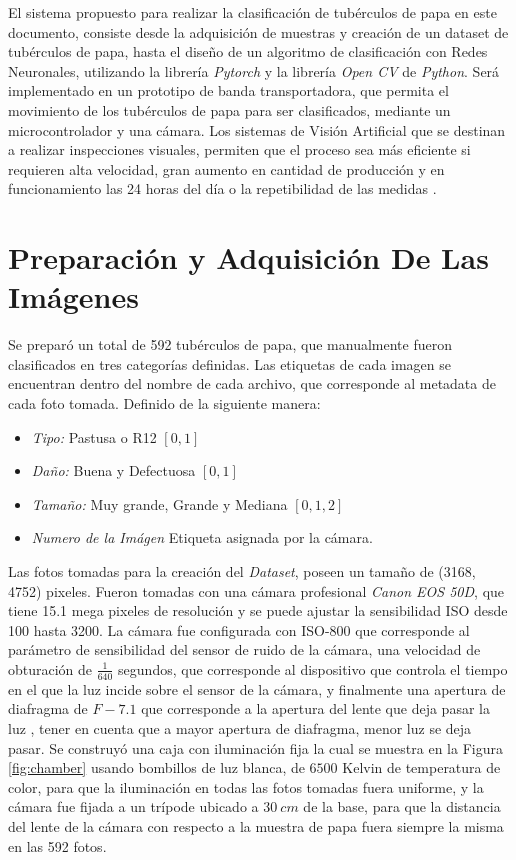 El sistema propuesto para realizar la clasificación de tubérculos de papa en este documento, consiste desde la adquisición de muestras y creación de un dataset de tubérculos de papa, hasta el diseño de un algoritmo de clasificación con Redes Neuronales, utilizando la librería \textit{Pytorch} y la librería \textit{Open CV} de \textit{Python}. Será implementado en un prototipo de banda transportadora, que permita el movimiento de los tubérculos de papa para ser clasificados, mediante un microcontrolador y una cámara. Los sistemas de Visión Artificial que se destinan a realizar inspecciones visuales, permiten que el proceso sea más eficiente si requieren alta velocidad, gran aumento en cantidad de producción y en funcionamiento las 24 horas del día o la repetibilidad de las medidas \cite{artificial2012aplicacion}.


\section{Preparación y Adquisición De Las Imágenes}

	Se preparó un total de 592 tubérculos de papa, que manualmente fueron clasificados en tres categorías definidas. Las etiquetas de cada imagen se encuentran dentro del nombre de cada archivo, que corresponde al metadata de cada foto tomada. Definido de la siguiente manera:
	
	\begin{itemize}
		\item \textit{Tipo:} Pastusa o R12 $[0,1]$
		\item \textit{Daño:} Buena y Defectuosa $[0,1]$
		\item \textit{Tamaño:} Muy grande, Grande y Mediana $[0,1,2]$
		\item \textit{Numero de la Imágen} Etiqueta asignada por la cámara.
	\end{itemize}	
	
	Las fotos tomadas para la creación del \textit{Dataset}, poseen un tamaño de (3168, 4752) pixeles. Fueron tomadas con una cámara profesional \textit{Canon EOS 50D}, que tiene 15.1 mega pixeles de resolución y se puede ajustar la sensibilidad ISO desde 100 hasta 3200. La cámara fue configurada con ISO-800 que corresponde al parámetro de sensibilidad del sensor de ruido de la cámara, una velocidad de obturación de $\frac{1}{640}$ segundos, que corresponde al dispositivo que controla el tiempo en el que la luz incide sobre el sensor de la cámara, y finalmente una apertura de diafragma de $F-7.1$ que corresponde a la apertura del lente que deja pasar la luz \cite{Camara}, tener en cuenta que a mayor apertura de diafragma, menor luz se deja pasar. Se construyó una caja con iluminación fija la cual se muestra en la Figura \ref{fig:chamber} usando bombillos de luz blanca, de $6500$ Kelvin de temperatura de color, para que la iluminación en todas las fotos tomadas fuera uniforme, y la cámara fue fijada a un trípode ubicado a $30 \ cm$ de la base, para que la distancia del lente de la cámara con respecto a la muestra de papa fuera siempre la misma en las 592 fotos.

